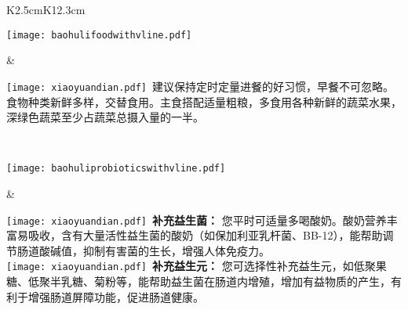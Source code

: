 \setlength{\arrayrulewidth}{.5pt}
\vspace*{-2mm}
\begin{center}
\begin{tabular}{K{2.5cm}K{12.3cm}}
\hline

\parbox[c][3cm]{.95\hsize}{
\noindent
\texttt{[image: baohulifoodwithvline.pdf]}
}
 &
\parbox{\hsize}{
\vspace*{0.5mm}
\begin{spacing}{1.5}
\fontsize{10pt}{10pt}
{\texttt{[image: xiaoyuandian.pdf]}\fontsize{9pt}{10pt}\selectfont \ 建议保持定时定量进餐的好习惯，早餐不可忽略。食物种类新鲜多样，交替食用。主食搭配适量粗粮，多食用各种新鲜的蔬菜水果，深绿色蔬菜至少占蔬菜总摄入量的一半。}
\end{spacing}
} \\
\hline

\parbox[c][4.5cm]{.95\hsize}{
\noindent
\texttt{[image: baohuliprobioticswithvline.pdf]}
}
 &
\parbox{\hsize}{
\vspace*{0.5mm}
\begin{spacing}{1.5}
\fontsize{10pt}{10pt}
{\texttt{[image: xiaoyuandian.pdf]}\fontsize{9pt}{10pt}\selectfont \ {\bf {补充益生菌：}} 您平时可适量多喝酸奶。酸奶营养丰富易吸收，含有大量活性益生菌的酸奶（如保加利亚乳杆菌、BB-12），能帮助调节肠道酸碱值，抑制有害菌的生长，增强人体免疫力。 \\}
{\texttt{[image: xiaoyuandian.pdf]}\fontsize{9pt}{10pt}\selectfont \ {\bf {补充益生元：}} 您可选择性补充益生元，如低聚果糖、低聚半乳糖、菊粉等，能帮助益生菌在肠道内增殖，增加有益物质的产生，有利于增强肠道屏障功能，促进肠道健康。}
\end{spacing}
} \\
\hline

\end{tabular}
\end{center}




